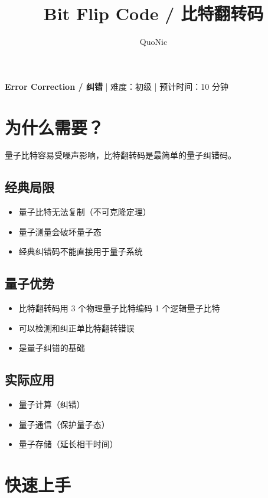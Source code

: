 \documentclass[12pt,a4paper]{article}
\title{Bit Flip Code / 比特翻转码}
\author{QuoNic}
\date{}
\begin{document}
\maketitle

\begin{center}
\textbf{Error Correction / 纠错} | 难度：初级 | 预计时间：10 分钟
\end{center}

\tableofcontents
\newpage

\section{为什么需要？}

量子比特容易受噪声影响，比特翻转码是最简单的量子纠错码。

\subsection{经典局限}
\begin{itemize}
  \item 量子比特无法复制（不可克隆定理）
  \item 量子测量会破坏量子态
  \item 经典纠错码不能直接用于量子系统
\end{itemize}

\subsection{量子优势}
\begin{itemize}
  \item 比特翻转码用 3 个物理量子比特编码 1 个逻辑量子比特
  \item 可以检测和纠正单比特翻转错误
  \item 是量子纠错的基础
\end{itemize}

\subsection{实际应用}
\begin{itemize}
  \item 量子计算（纠错）
  \item 量子通信（保护量子态）
  \item 量子存储（延长相干时间）
\end{itemize}

\section{快速上手}
\end{document}
